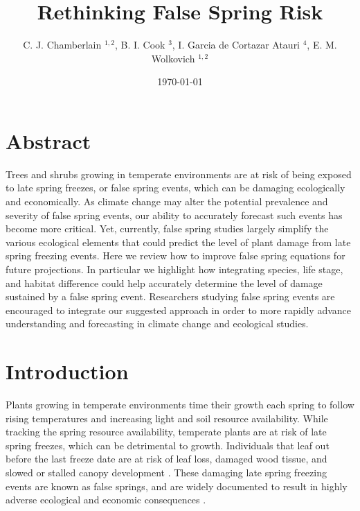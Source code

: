 \documentclass{article}\usepackage[]{graphicx}\usepackage[]{color}
\begin{document}
\title{Rethinking False Spring Risk}
\author{C. J. Chamberlain $^{1,2}$, B. I. Cook $^{3}$, I. Garcia de Cortazar Atauri $^{4}$, E. M. Wolkovich $^{1,2}$}
\date{\today}
\maketitle 
 

\renewcommand{\thetable}{\arabic{table}}
\renewcommand{\thefigure}{\arabic{figure}}
\renewcommand{\labelitemi}{$-$}



\section{Abstract}
Trees and shrubs growing in temperate environments are at risk of being exposed to late spring freezes, or false spring events, which can be damaging ecologically and economically. As climate change may alter the potential prevalence and severity of false spring events, our ability to accurately forecast such events has become more critical. Yet, currently, false spring studies largely simplify the various ecological elements that could predict the level of plant damage from late spring freezing events. Here we review how to improve false spring equations for future projections. In particular we highlight how integrating species, life stage, and habitat difference could help accurately determine the level of damage sustained by a false spring event. Researchers studying false spring events are encouraged to integrate our suggested approach in order to more rapidly advance understanding and forecasting in climate change and ecological studies.

\section{Introduction}

Plants growing in temperate environments time their growth each spring to follow rising temperatures and increasing light and soil resource availability. While tracking the spring resource availability, temperate plants are at risk of late spring freezes, which can be detrimental to growth. Individuals that leaf out before the last freeze date are at risk of leaf loss, damaged wood tissue, and slowed or stalled canopy development \citep{Gu2008, Hufkens2012}. These damaging late spring freezing events are known as false springs, and are widely documented to result in highly adverse ecological and economic consequences \citep{Knudson2012, Ault2013}.
\end{document}
